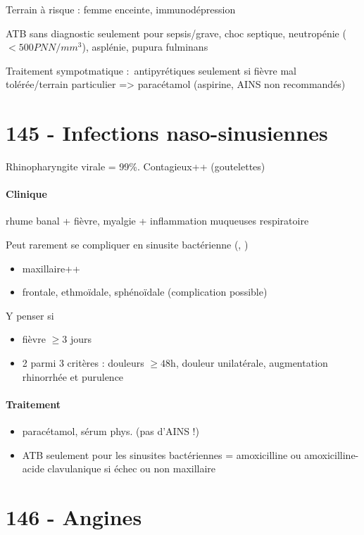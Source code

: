 Terrain à risque : femme enceinte, immunodépression

\danger ATB sans diagnostic seulement pour sepsis/grave, choc septique,
neutropénie (\(< 500 PNN/mm^3\)), asplénie, pupura fulminans

Traitement sympotmatique :~antipyrétiques seulement si fièvre mal
tolérée/terrain particulier =\textgreater{} paracétamol (aspirine, AINS
non recommandés)

\section{145 - Infections naso-sinusiennes}%
\label{sec:item_145_infections_naso_sinusiennes}

Rhinopharyngite virale =  99\%. Contagieux++ (goutelettes)

\paragraph{Clinique} rhume banal + fièvre, myalgie + inflammation muqueuses respiratoire

Peut rarement se compliquer en sinusite bactérienne (,
)
\begin{itemize}
  \item maxillaire++
  \item frontale, ethmoïdale, sphénoïdale (complication possible)
\end{itemize}
Y penser si 
\begin{itemize}
  \item fièvre $\ge 3$ jours
    \item 2 parmi 3 critères : douleurs $\ge 48$h, douleur unilatérale,
      augmentation rhinorrhée et purulence
\end{itemize}

\paragraph{Traitement}%
\label{par:traitement}
\begin{itemize}
  \item paracétamol, sérum phys. (pas d'AINS !)
  \item ATB seulement pour les sinusites bactériennes = amoxicilline ou
    amoxicilline-acide clavulanique si échec ou non maxillaire
\end{itemize}
\section{146 - Angines}%
\label{sec:item_146_angines}

